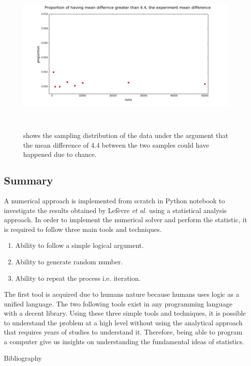 \begin{figure}[t]
\centerline{\includegraphics[height=8cm,width=16cm]{./figures/proportion}}
\caption{shows the sampling distribution of the data under the argument that the mean difference of 4.4 between the two samples could have happened due to chance. \label{prop_0}}
\end{figure}

\subsection{Summary}
A numerical approach is implemented from scratch in Python notebook to investigate the results obtained by Lef\`evre \textit{et al.} using a statistical analysis approach. In order to implement the numerical solver and perform the statistic, it is required to follow three main tools and techniques.
\begin{enumerate}
  \item Ability to follow a simple logical argument.
  \item Ability to generate random number.
  \item Ability to repeat the process i.e. iteration.
\end{enumerate}
The first tool is acquired due to humans nature because humans uses logic as a unified language. The two following tools exist in any programming language with a decent library. Using these three simple tools and techniques, it is possible to understand the problem at a high level without using the analytical approach that requires years of studies to understand it. Therefore, being able to program a computer give us insights on understanding the fundamental ideas of statistics.

\newpage



\cleardoublepage

 {Bibliography}








